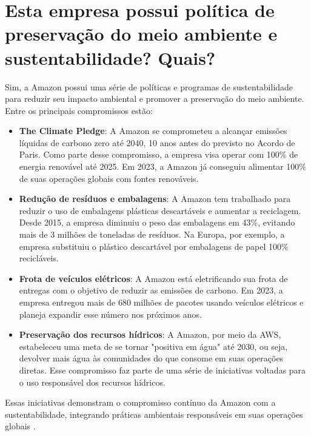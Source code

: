 \section{Esta empresa possui política de preservação do meio ambiente e sustentabilidade? Quais?}

Sim, a Amazon possui uma série de políticas e programas de sustentabilidade para reduzir seu impacto ambiental e promover a preservação do meio ambiente. Entre os principais compromissos estão:

\begin{itemize}
    \item \textbf{The Climate Pledge}: A Amazon se comprometeu a alcançar emissões líquidas de carbono zero até 2040, 10 anos antes do previsto no Acordo de Paris. Como parte desse compromisso, a empresa visa operar com 100\% de energia renovável até 2025. Em 2023, a Amazon já conseguiu alimentar 100\% de suas operações globais com fontes renováveis.

    \item \textbf{Redução de resíduos e embalagens}: A Amazon tem trabalhado para reduzir o uso de embalagens plásticas descartáveis e aumentar a reciclagem. Desde 2015, a empresa diminuiu o peso das embalagens em 43\%, evitando mais de 3 milhões de toneladas de resíduos. Na Europa, por exemplo, a empresa substituiu o plástico descartável por embalagens de papel 100\% recicláveis.

    \item \textbf{Frota de veículos elétricos}: A Amazon está eletrificando sua frota de entregas com o objetivo de reduzir as emissões de carbono. Em 2023, a empresa entregou mais de 680 milhões de pacotes usando veículos elétricos e planeja expandir esse número nos próximos anos.

    \item \textbf{Preservação dos recursos hídricos}: A Amazon, por meio da AWS, estabeleceu uma meta de se tornar "positiva em água" até 2030, ou seja, devolver mais água às comunidades do que consome em suas operações diretas. Esse compromisso faz parte de uma série de iniciativas voltadas para o uso responsável dos recursos hídricos.
\end{itemize}

Essas iniciativas demonstram o compromisso contínuo da Amazon com a sustentabilidade, integrando práticas ambientais responsáveis em suas operações globais \cite{amazonSustainability2023, amazonGlobalImpact2023}.

